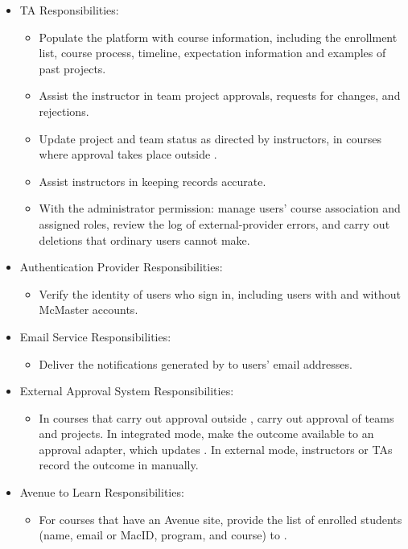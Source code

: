 \documentclass[12pt]{article}
\begin{document}
\begin{itemize}
    \item TA Responsibilities:
    \begin{itemize}
      \item Populate the platform with course information, including the enrollment list, course process,
      timeline, expectation information and examples of past projects.
      \item Assist the instructor in team project approvals, requests for changes, and rejections.
      \item Update project and team status as directed by instructors, in courses where approval
      takes place outside \projname{}.
      \item Assist instructors in keeping records accurate.
      \item With the administrator permission: manage users' course association and assigned roles, review the log of external-provider errors, and carry out deletions that ordinary users cannot make.
    \end{itemize}
    \item Authentication Provider Responsibilities:
    \begin{itemize}
      \item Verify the identity of users who sign in, including users with and without McMaster accounts.
    \end{itemize}
    \item Email Service Responsibilities:
    \begin{itemize}
      \item Deliver the notifications generated by \projname{} to users' email addresses.
    \end{itemize}
    \item External Approval System Responsibilities:
    \begin{itemize}
      \item In courses that carry out approval outside \projname{}, carry out approval of teams and projects.
      In integrated mode, make the outcome available to an approval adapter, which updates \projname{}. In external mode,
      instructors or TAs record the outcome in \projname{} manually.
    \end{itemize}
    \item Avenue to Learn Responsibilities:
    \begin{itemize}
      \item For courses that have an Avenue site, provide the list of enrolled students (name, email or MacID,
      program, and course) to \projname{}.

\end{itemize}
\end{itemize}
\end{document}
